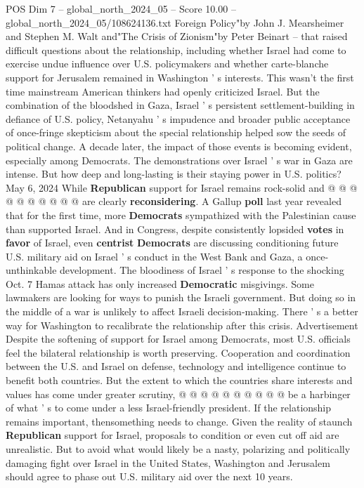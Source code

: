 \begin{textsample}{POS Dim 7 – global\_north\_2024\_05 – Score 10.00 – global\_north\_2024\_05/108624136.txt}
Foreign Policy"by John J.
Mearsheimer and Stephen M.
Walt and"The Crisis of Zionism"by Peter Beinart -- that raised difficult questions about the relationship, including whether Israel had come to exercise undue influence over U.S. policymakers and whether carte-blanche support for Jerusalem remained in Washington ' s interests.
This wasn't the first time mainstream American thinkers had openly criticized Israel.
But the combination of the bloodshed in Gaza, Israel ' s persistent settlement-building in defiance of U.S. policy, Netanyahu ' s impudence and broader public acceptance of once-fringe skepticism about the special relationship helped sow the seeds of political change.
A decade later, the impact of those events is becoming evident, especially among Democrats.
The demonstrations over Israel ' s war in Gaza are intense.
But how deep and long-lasting is their staying power in U.S. politics?
May 6, 2024 While \textbf{Republican} support for Israel remains rock-solid and @ @ @ @ @ @ @ @ @ @ are clearly \textbf{reconsidering}.
A Gallup \textbf{poll} last year revealed that for the first time, more \textbf{Democrats} sympathized with the Palestinian cause than supported Israel.
And in Congress, despite consistently lopsided \textbf{votes} in \textbf{favor} of Israel, even \textbf{centrist} \textbf{Democrats} are discussing conditioning future U.S. military aid on Israel ' s conduct in the West Bank and Gaza, a once-unthinkable development.
The bloodiness of Israel ' s response to the shocking Oct. 7 Hamas attack has only increased \textbf{Democratic} misgivings.
Some lawmakers are looking for ways to punish the Israeli government.
But doing so in the middle of a war is unlikely to affect Israeli decision-making.
There ' s a better way for Washington to recalibrate the relationship after this crisis.
Advertisement Despite the softening of support for Israel among Democrats, most U.S. officials feel the bilateral relationship is worth preserving.
Cooperation and coordination between the U.S. and Israel on defense, technology and intelligence continue to benefit both countries.
But the extent to which the countries share interests and values has come under greater scrutiny, @ @ @ @ @ @ @ @ @ @ be a harbinger of what ' s to come under a less Israel-friendly president.
If the relationship remains important, thensomething needs to change.
Given the reality of staunch \textbf{Republican} support for Israel, proposals to condition or even cut off aid are unrealistic.
But to avoid what would likely be a nasty, polarizing and politically damaging fight over Israel in the United States, Washington and Jerusalem should agree to phase out U.S. military aid over the next 10 years.

\end{textsample}
